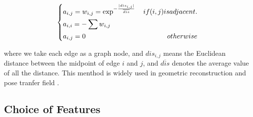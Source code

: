 \begin{equation}
\left\{
\begin{gathered}
a_{i,j} = w_{i,j} = \exp^{-\frac{|dis_{i,j}|}{\overline{dis}}} \quad \hfill if (i,j) is adjacent. \\
a_{i,i} = -\sum w_{i,j} \quad \hfill \\
a_{i,j} = 0 \quad \hfill otherwise \\
\end{gathered}
\right.
\end{equation}

where we take each edge as a graph node, and $dis_{i,j}$ means the Euclidean distance between the midpoint of edge $i$ and $j$, and $\overline{dis}$ denotes the average value of all the distance. This menthod is widely used in geometric reconstruction and pose tranfer field \cite{Levy:2006:LET:1136647.1136965}.

\subsection{Choice of Features}
